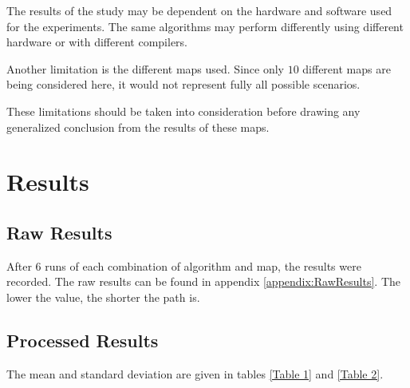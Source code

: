 \documentclass{article}
\begin{document}
\noindent
The results of the study may be dependent on the hardware and software used for the experiments. The same algorithms may perform differently using different hardware or with different compilers.

\noindent
Another limitation is the different maps used. Since only $10$ different maps are being considered here, it would not represent fully all possible scenarios. 

\noindent
These limitations should be taken into consideration before drawing any generalized conclusion from the results of these maps.


\section{Results}\label{Results}
\subsection{Raw Results}
After 6 runs of each combination of algorithm and map, the results were recorded. The raw results can be found in appendix \ref{appendix:RawResults}. The lower the value, the shorter the path is.


\subsection{Processed Results}

The mean and standard deviation are given in tables \ref{Table 1} and \ref{Table 2}. 
\end{document}
